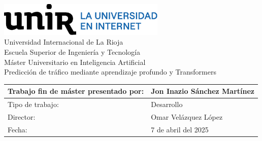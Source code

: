 \begin{titlepage}
	
	
	\centering
	\vspace{3cm}
	\includegraphics[width=0.60\textwidth]{includes/logoUnir.eps}\\	
	{\Huge Universidad Internacional de La Rioja \\}
	{\LARGE Escuela Superior de Ingeniería y Tecnología \\}
	\vspace{3cm}
	\setmainfont{Calibri Light}
	{\Large Máster Universitario en Inteligencia Artificial\\}
	\setmainfont{Calibri}
	{\Huge\textcolor{blueUnir}{Predicción de tráfico mediante aprendizaje profundo y Transformers} \\}
	\vfill{}
	\def\arraystretch{1}
	\setmainfont{Calibri Light}
	\begin{tabular}{| p{8cm} | p{7cm} |}
		\arrayrulecolor{gray80}
		\hline
		Trabajo fin de máster presentado por: & Jon Inazio Sánchez Martínez \\
		\hline
		Tipo de trabajo: & Desarrollo \\
		\hline
		Director: & Omar Velázquez López \\
		\hline
		Fecha: & 7 de abril del 2025 \\
		\hline
	\end{tabular}
\vspace{4cm}
\end{titlepage}